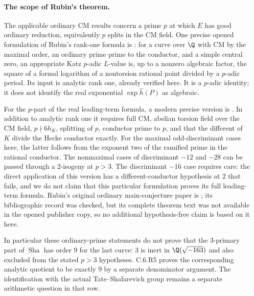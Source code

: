 \paragraph{The scope of Rubin's theorem.}
The applicable ordinary CM results concern a prime $p$ at which
$E$ has good ordinary reduction, equivalently $p$ splits in the CM
field. One precise opened formulation of Rubin's rank-one formula
is \citet[Theorem 1]{CrBDP2012}: for a curve over $\Q$ with CM
by the maximal order, an ordinary prime prime to the conductor,
and a simple central zero, an appropriate Katz $p$-adic $L$-value
is, up to a nonzero algebraic factor, the square of a formal
logarithm of a nontorsion rational point divided by a $p$-adic
period. Its input is analytic rank one, already verified here.
It is a $p$-adic identity; it does not identify the real exponential
$\exp\widehat h(P)$ as algebraic.

For the $p$-part of the real leading-term formula, a modern precise
version is \citet[Theorem A]{CrCastella2025}. In addition to analytic
rank one it requires full CM, abelian torsion field over the CM
field, $p\nmid6h_K$, splitting of $p$, conductor prime to $p$,
and that the different of $K$ divide the Hecke conductor exactly.
For the maximal odd-discriminant cases here, the latter follows
from the exponent two of the ramified prime in the rational
conductor. The nonmaximal cases of discriminant $-12$ and $-28$
can be passed through a $2$-isogeny at $p>3$. The discriminant
$-16$ case requires care: the direct application of this version
has a different-conductor hypothesis at $2$ that fails, and we
do not claim that this particular formulation proves its full
leading-term formula. Rubin's original ordinary main-conjecture
paper is \citep{CrRubin1991}; its bibliographic record was checked,
but its complete theorem text was not available in the opened
publisher copy, so no additional hypothesis-free claim is based
on it here.

In particular these ordinary-prime statements do not prove that
the $3$-primary part of $\operatorname{Sha}$ has order $9$ for the
last curve: $3$ is inert in $\Q(\sqrt{-163})$ and also excluded
from the stated $p>3$ hypotheses. C.6.R5 proves the corresponding
analytic quotient to be exactly $9$ by a separate denominator
argument. The identification with the actual Tate--Shafarevich
group remains a separate arithmetic question in that row.

